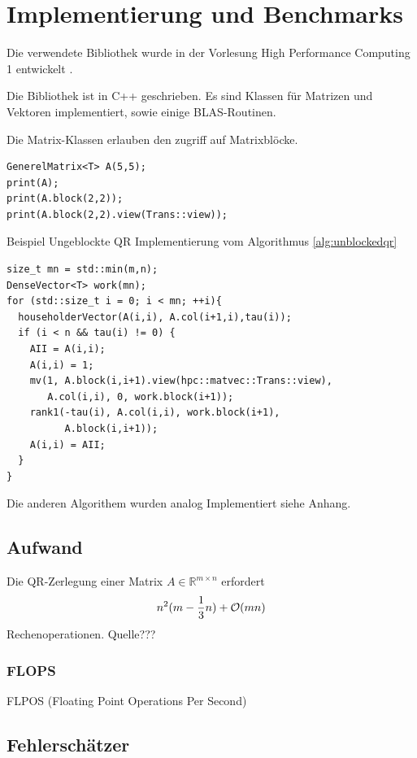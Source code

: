 \chapter{Implementierung und Benchmarks}
Die verwendete Bibliothek wurde in der Vorlesung High Performance Computing 1 entwickelt \cite{HPC1}.

Die Bibliothek ist in C++ geschrieben. Es sind Klassen für Matrizen und Vektoren implementiert, sowie einige BLAS-Routinen.

Die Matrix-Klassen erlauben den zugriff auf Matrixblöcke. 
\begin{lstlisting}
GenerelMatrix<T> A(5,5);
print(A);
print(A.block(2,2));
print(A.block(2,2).view(Trans::view));
\end{lstlisting}



Beispiel Ungeblockte QR Implementierung vom Algorithmus \ref{alg:unblockedqr}
\begin{lstlisting}
size_t mn = std::min(m,n);
DenseVector<T> work(mn);
for (std::size_t i = 0; i < mn; ++i){
  householderVector(A(i,i), A.col(i+1,i),tau(i));
  if (i < n && tau(i) != 0) {
    AII = A(i,i);
    A(i,i) = 1;
    mv(1, A.block(i,i+1).view(hpc::matvec::Trans::view),
       A.col(i,i), 0, work.block(i+1));
    rank1(-tau(i), A.col(i,i), work.block(i+1), 
          A.block(i,i+1));
    A(i,i) = AII;
  }
}
\end{lstlisting}

Die anderen Algorithem wurden analog Implementiert siehe Anhang.


\section{Aufwand}

Die QR-Zerlegung einer Matrix $A \in \mathbb{R}^{m \times n}$  erfordert
\begin{align*}
	n^2(m-\frac{1}{3} n) + {\cal O}(mn)
\end{align*}
Rechenoperationen. Quelle???

\subsection{FLOPS}
FLPOS (Floating Point Operations Per Second) 

\section{Fehlerschätzer}

